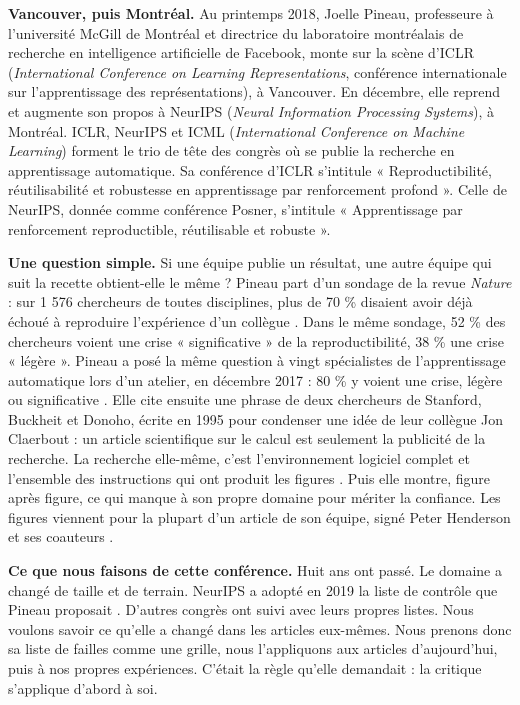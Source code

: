 \documentclass[11pt,a4paper]{article}
\begin{document}
\textbf{Vancouver, puis Montréal.} Au printemps 2018, Joelle Pineau,
professeure à l'université McGill de Montréal et directrice du
laboratoire montréalais de recherche en intelligence artificielle de
Facebook, monte sur la scène d'ICLR (\emph{International Conference on
Learning Representations}, conférence internationale sur l'apprentissage
des représentations), à Vancouver. En décembre, elle reprend et augmente
son propos à NeurIPS (\emph{Neural Information Processing Systems}), à
Montréal. ICLR, NeurIPS et ICML (\emph{International Conference on
Machine Learning}) forment le trio de tête des congrès où se publie la
recherche en apprentissage automatique. Sa conférence d'ICLR s'intitule
« Reproductibilité, réutilisabilité et robustesse en apprentissage par
renforcement profond ». Celle de NeurIPS, donnée comme conférence
Posner, s'intitule « Apprentissage par renforcement reproductible,
réutilisable et robuste ».

\textbf{Une question simple.} Si une équipe publie un résultat, une
autre équipe qui suit la recette obtient-elle le même ? Pineau part d'un
sondage de la revue \emph{Nature} : sur 1 576 chercheurs de toutes
disciplines, plus de 70 \% disaient avoir déjà échoué à reproduire
l'expérience d'un collègue \autocite{baker2016reproducibility}. Dans le
même sondage, 52 \% des chercheurs voient une crise « significative » de
la reproductibilité, 38 \% une crise « légère ». Pineau a posé la même
question à vingt spécialistes de l'apprentissage automatique lors d'un
atelier, en décembre 2017 : 80 \% y voient une crise, légère ou
significative \autocite{pineau2018iclr}. Elle cite ensuite une phrase de
deux chercheurs de Stanford, Buckheit et Donoho, écrite en 1995 pour
condenser une idée de leur collègue Jon Claerbout : un article
scientifique sur le calcul est seulement la publicité de la recherche.
La recherche elle-même, c'est l'environnement logiciel complet et
l'ensemble des instructions qui ont produit les figures
\autocite{buckheit1995wavelab}. Puis elle montre, figure après figure,
ce qui manque à son propre domaine pour mériter la confiance. Les
figures viennent pour la plupart d'un article de son équipe, signé Peter
Henderson et ses coauteurs \autocite{henderson2018matters}.

\textbf{Ce que nous faisons de cette conférence.} Huit ans ont passé. Le
domaine a changé de taille et de terrain. NeurIPS a adopté en 2019 la
liste de contrôle que Pineau proposait \autocite{pineau2021improving}.
D'autres congrès ont suivi avec leurs propres listes. Nous voulons
savoir ce qu'elle a changé dans les articles eux-mêmes. Nous prenons
donc sa liste de failles comme une grille, nous l'appliquons aux
articles d'aujourd'hui, puis à nos propres expériences. C'était la règle
qu'elle demandait : la critique s'applique d'abord à soi.
\end{document}
